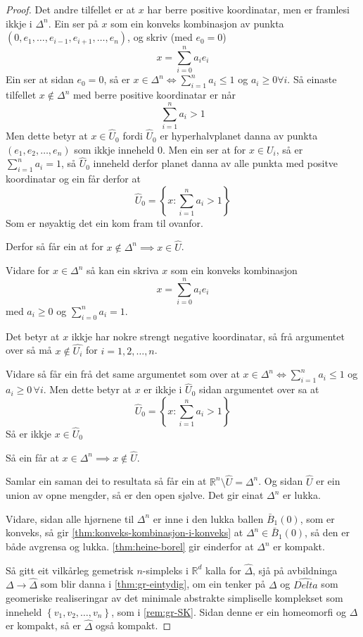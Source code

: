\documentclass[a4paper, 12pt, norsk]{article}
\theoremstyle{plain}
\theoremstyle{definition}
\newcommand{\Rb}{\mathbb{R}}
\newcommand{\set}[1]{ \left\{ #1 \right\} } %
\newcommand{\tuple}[1]{ \left( #1 \right) } %
\begin{document}
\begin{proof}
	Det andre tilfellet er at \( x \) har berre positive koordinatar, men er framlesi ikkje i \( \Delta^n \). Ein ser på \( x \) som ein konveks kombinasjon av punkta \( \tuple{0, e_1, \dots, e_{i-1}, e_{i+1}, \dots, e_n} \), og skriv (med \( e_0 = 0 \))
	\[
		x = \sum_{i=0}^n a_i e_i
	\]
	Ein ser at sidan \( e_0 = 0 \), så er \( x \in \Delta^n \iff \sum_{i=1}^n a_i \leq 1 \) og \( a_i \geq 0 \forall i \). Så einaste tilfellet \( x \not\in \Delta^n \) med berre positive koordinatar er når
	\[
		\sum_{i=1}^n a_i > 1
	\]
	Men dette betyr at \( x \in \hat{U}_0 \) fordi \( \hat{U}_0 \) er hyperhalvplanet danna av punkta \( \tuple{e_1, e_2, \dots, e_n} \) som ikkje inneheld \( 0 \). Men ein ser at for \( x \in U_i \), så er \( \sum_{i=1}^n a_i = 1 \), så \( \hat{U}_0 \) inneheld derfor planet danna av alle punkta med positve koordinatar og ein får derfor at
	\[
		\hat{U}_0 = \set{ x : \sum_{i=1}^n a_i > 1}
	\]
	Som er nøyaktig det ein kom fram til ovanfor.

	Derfor så får ein at for \( x \not\in \Delta^n \implies x \in \hat{U} \).

	Vidare for \( x \in \Delta^n \) så kan ein skriva \( x \) som ein konveks kombinasjon
	\[
		x = \sum_{i=0}^n a_i e_i
	\]
	med \( a_i \geq 0 \) og \( \sum_{i=0}^n a_i = 1 \).

	Det betyr at \( x \) ikkje har nokre strengt negative koordinatar, så frå argumentet over så må \( x \not\in \hat{U_i} \) for \( i = 1, 2, \dots, n \).

	Vidare så får ein frå det same argumentet som over at \( x \in \Delta^n \iff \sum_{i=1}^n a_i \leq 1 \) og \( a_i \geq 0 \, \forall i \). Men dette betyr at \( x \) er ikkje i \( \hat{U}_0 \) sidan argumentet over sa at
	\[
		\hat{U}_0 = \set{ x : \sum_{i=1}^n a_i > 1}
	\]
	Så er ikkje \( x \in \hat{U}_0 \)

	Så ein får at \( x \in \Delta^n \implies x \not\in \hat{U} \).

	Samlar ein saman dei to resultata så får ein at \( \Rb^n \setminus \hat{U} = \Delta^n \). Og sidan \( \hat{U} \) er ein union av opne mengder, så er den open sjølve. Det gir einat \( \Delta^n \) er lukka.

	Vidare, sidan alle hjørnene til \( \Delta^n \) er inne i den lukka ballen \( \bar{B}_{1}(0) \), som er konveks, så gir \autoref{thm:konveks-kombinasjon-i-konveks} at \( \Delta^n \in \bar{B}_{1}(0) \), så den er både avgrensa og lukka. \autoref{thm:heine-borel} gir einderfor at \( \Delta^n \) er kompakt.

	Så gitt eit vilkårleg gemetrisk \( n \)-simpleks i \( \Rb^d \) kalla for \( \hat{\Delta} \), sjå på avbildninga \( \Delta \to \hat{\Delta} \) som blir danna i \autoref{thm:gr-eintydig}, om ein tenker på \( \Delta \) og \( \hat{Delta} \) som geomeriske realiseringar av det minimale abstrakte simpliselle komplekset som inneheld \( \set{v_1, v_2, \dots, v_n} \), som i \autoref{rem:gr-SK}. Sidan denne er ein homeomorfi og \( \Delta \) er kompakt, så er \( \hat{\Delta} \) også kompakt.


\end{proof}
\end{document}
